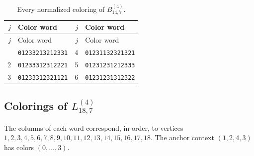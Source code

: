 \documentclass[aps,pra,reprint,superscriptaddress,longbibliography,nofootinbib,floatfix,10pt]{revtex4-2}
\theoremstyle{definition}
\begin{document}
\begingroup\footnotesize\setlength{\tabcolsep}{3pt}\setlength{\LTpre}{5pt}\setlength{\LTpost}{8pt}
\begin{longtable}{rl@{\qquad}rl}
\caption{Every normalized coloring of $B_{14,7}^{(4)}$.}\label{tab:colors-4c}\\\toprule $j$ & Color word & $j$ & Color word\\\midrule\endfirsthead
\toprule $j$ & Color word & $j$ & Color word\\\midrule\endhead\bottomrule\endfoot
1 & \texttt{01233213212331} & 4 & \texttt{01231132321321}\\
2 & \texttt{01233312312221} & 5 & \texttt{01231231212333}\\
3 & \texttt{01233312321121} & 6 & \texttt{01231231312322}\\
\end{longtable}\endgroup
{}\subsection{Colorings of \texorpdfstring{$L_{18,7}^{(4)}$}{gadget 4d}}
The columns of each word correspond, in order, to vertices $1,\allowbreak 2,\allowbreak 3,\allowbreak 4,\allowbreak 5,\allowbreak 6,\allowbreak 7,\allowbreak 8,\allowbreak 9,\allowbreak 10,\allowbreak 11,\allowbreak 12,\allowbreak 13,\allowbreak 14,\allowbreak 15,\allowbreak 16,\allowbreak 17,\allowbreak 18$. The anchor context $(1,2,4,3)$ has colors $(0,\ldots,3)$.
\begingroup\footnotesize\setlength{\tabcolsep}{3pt}\setlength{\LTpre}{5pt}\setlength{\LTpost}{8pt}
\end{document}
